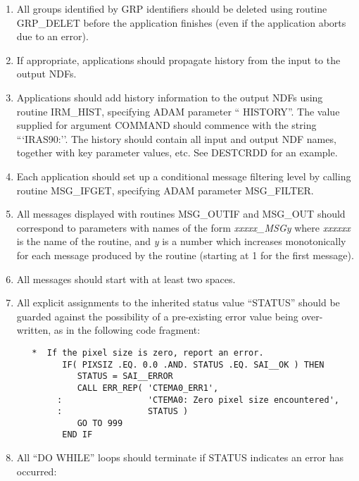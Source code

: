 \begin{enumerate}
\item All groups identified by {\small GRP} identifiers should be deleted using
routine {\small GRP\_DELET} before the application finishes (even if the 
application aborts due to an error).

\item If appropriate, applications should propagate history from the input to 
the output {\small NDF}s.

\item \label{IT:HIS} Applications should add history information to the output {\small NDF}s
using routine {\small IRM\_HIST}, specifying {\small ADAM} parameter ``{\small
HISTORY}''. The value supplied for argument {\small COMMAND} should commence
with the string ```IRAS90:''. The history should contain all input and output
{\small NDF} names, together with key parameter values, etc. See {\small
DESTCRDD} for an example. 

\item \label{IT:MSG_FILTER} Each application should set up a conditional message
filtering level by calling routine {\small MSG\_IFGET}, specifying {\small ADAM}
parameter {\small MSG\_FILTER}. 

\item All messages displayed with routines {\small MSG\_OUTIF} and {\small
MSG\_OUT} should correspond to parameters with names of the form {\em
xxxxx\_MSGy} where {\em xxxxxx} is the name of the routine, and {\em y} is a
number which increases monotonically for each message produced by the routine
(starting at 1 for the first message). 

\item All messages should start with at least two spaces.

\item All explicit assignments to the inherited status value ``{\small STATUS}''
should be guarded against the possibility of a pre-existing error value being 
over-written, as in the following code fragment:

\small
\begin{verbatim}
   *  If the pixel size is zero, report an error.
         IF( PIXSIZ .EQ. 0.0 .AND. STATUS .EQ. SAI__OK ) THEN
            STATUS = SAI__ERROR
            CALL ERR_REP( 'CTEMA0_ERR1', 
        :                 'CTEMA0: Zero pixel size encountered',
        :                 STATUS )
            GO TO 999
         END IF
\end{verbatim}
\normalsize

\item All ``{\small DO WHILE}'' loops should terminate if {\small STATUS} 
indicates an error has occurred:


\end{enumerate}
